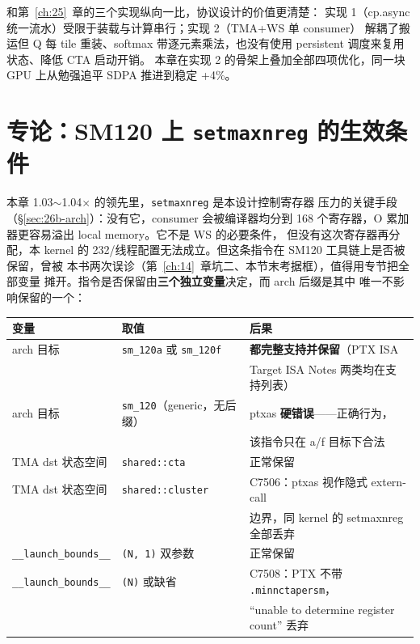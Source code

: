 和第~\ref{ch:25}~章的三个实现纵向一比，协议设计的价值更清楚：
实现 1（cp.async 统一流水）受限于装载与计算串行；实现 2（TMA+WS 单 consumer）
解耦了搬运但 Q 每 tile 重装、softmax 带逐元素乘法，也没有使用 persistent
调度来复用状态、降低 CTA 启动开销。
本章在实现 2 的骨架上叠加全部四项优化，同一块 GPU 上从勉强追平 SDPA
推进到稳定 +4\%。

\section{专论：SM120 上 \texttt{setmaxnreg} 的生效条件}\label{sec:26b-setmaxnreg}

本章 1.03$\sim$1.04$\times$ 的领先里，\texttt{setmaxnreg} 是本设计控制寄存器
压力的关键手段（\S\ref{sec:26b-arch}）：没有它，consumer 会被编译器均分到
168 个寄存器，O 累加器更容易溢出 local memory。它不是 WS 的必要条件，
但没有这次寄存器再分配，本 kernel 的 232/线程配置无法成立。但这条指令在 SM120 工具链上是否被保留，曾被
本书两次误诊（第~\ref{ch:14}~章坑二、本节末考据框），值得用专节把全部变量
摊开。指令是否保留由\textbf{三个独立变量}决定，而 arch 后缀是其中
唯一不影响保留的一个：

\begin{center}
\footnotesize
\begin{tabular}{@{}lll@{}}
\toprule
变量 & 取值 & 后果 \\
\midrule
arch 目标 & \texttt{sm\_120a} 或 \texttt{sm\_120f} & \textbf{都完整支持并保留}（PTX ISA \\
 & & Target ISA Notes 两类均在支持列表） \\
arch 目标 & \texttt{sm\_120}（generic，无后缀） & ptxas \textbf{硬错误}——正确行为， \\
 & & 该指令只在 a/f 目标下合法 \\
TMA dst 状态空间 & \texttt{shared::cta} & 正常保留 \\
TMA dst 状态空间 & \texttt{shared::cluster} & C7506：ptxas 视作隐式 extern-call \\
 & & 边界，同 kernel 的 setmaxnreg 全部丢弃 \\
\texttt{\_\_launch\_bounds\_\_} & \texttt{(N, 1)} 双参数 & 正常保留 \\
\texttt{\_\_launch\_bounds\_\_} & \texttt{(N)} 或缺省 & C7508：PTX 不带 \texttt{.minnctapersm}， \\
 & & ``unable to determine register count'' 丢弃 \\
\bottomrule
\end{tabular}
\end{center}

